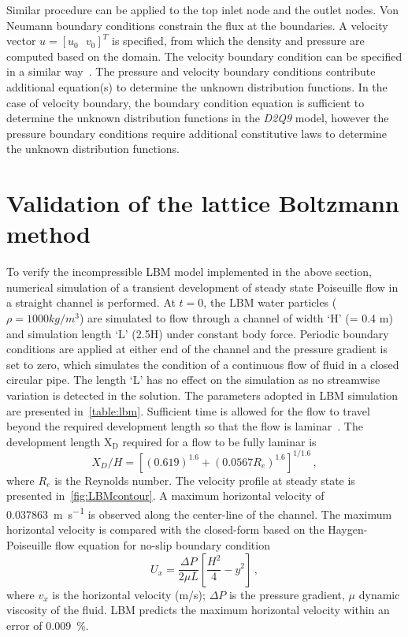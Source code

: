Similar procedure can be applied to the top inlet node and the outlet 
nodes. Von Neumann boundary conditions constrain the flux at the boundaries. A 
velocity vector $u=\left[ u_0\mbox{ }v_0 \right]^T$ is specified, from which 
the density and pressure are computed based on the domain. The velocity 
boundary condition can be specified in a similar way~\citep{Zou1997}. The 
pressure and velocity boundary conditions contribute additional equation(s) 
to determine the unknown distribution functions. In the case of velocity 
boundary, the boundary condition equation is sufficient to determine the 
unknown distribution functions in the \textit{D2Q9} model, however the pressure 
boundary conditions 
require additional constitutive laws to determine the unknown distribution 
functions. 

\section{Validation of the lattice Boltzmann method}

To verify the incompressible LBM model implemented in the above section, 
numerical simulation of a transient development of steady state 
Poiseuille flow in a straight channel is performed. At $t=0$, the LBM water 
particles ($\rho=1000 kg/m^{3}$) are simulated to flow through a channel of 
width `H' (= 0.4 \si{\meter}) and simulation length `L' (2.5H) under constant 
body force. Periodic boundary conditions are applied at either end of the 
channel and the pressure gradient is set to zero, which simulates the condition 
of a continuous flow of fluid in a closed circular pipe. The length `L' has no 
effect on the simulation as no streamwise variation is detected in the 
solution. The parameters adopted in LBM simulation are presented 
in~\cref{table:lbm}. Sufficient time is allowed for the flow to travel beyond 
the required development length so that the flow is laminar~\citep{Durst2005}. 
The development length  $\mathrm{X}_{\mathrm{D}}$ required for a flow to be 
fully laminar is
%
\begin{equation}
X_{D}/H=[(0.619)^{1.6}+(0.0567 R_{e})^{1.6}]^{1/1.6} \,,
\end{equation}
%
\noindent where $R_{e}$ is the Reynolds number. The velocity profile at steady 
state is presented in~\cref{fig:LBMcontour}. A maximum 
horizontal velocity of 0.037863~\si{\meter\per\second} is observed along the 
center-line of the channel. The maximum horizontal velocity is compared with 
the closed-form based on the Haygen-Poiseuille flow equation for no-slip 
boundary condition~\citep{Willis2008}
%
\begin{equation}
	\mathit{U}_{\mathit{x}}=\frac{\Delta P}{2 \mu L} [\frac{H^{2}}{4}-y^{2}]\,,
\end{equation}
%
\noindent where $v_{x}$ is the horizontal velocity (m/s); $\Delta P$ is the 
pressure gradient, $\mu$ dynamic viscosity of the fluid. LBM predicts the 
maximum horizontal velocity within an error of 0.009~\%.

